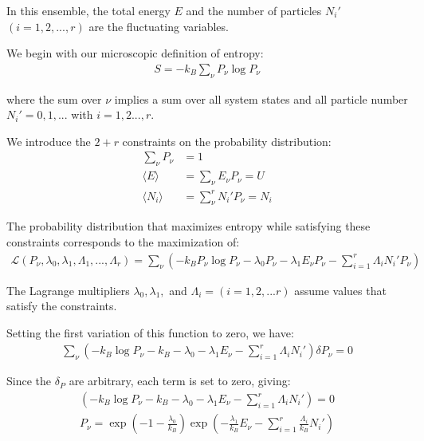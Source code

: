 \documentclass[book.tex]{subfiles}
\begin{document}

In this ensemble, the total energy $E$ and the number of particles $N_i'$ $(i=1,2,...,r)$ are the fluctuating variables.

We begin with our microscopic definition of entropy:
\begin{align}
S = -k_B \sum_\nu P_\nu \log P_\nu 
\end{align}

\noindent where the sum over $\nu$ implies a sum over all system states and
all particle number $N_i' = 0,1,...$ with $i = 1,2...,r$.

We introduce the $2+r$ constraints on the probability distribution:
\begin{align}
\sum_\nu P_\nu &= 1\\
\langle E\rangle &= \sum_\nu E_\nu P_\nu = U \\
\langle N_i \rangle &= \sum_\nu^r N_i' P_\nu = N_i 
\end{align}

The probability distribution that maximizes entropy while satisfying these constraints corresponds to the maximization of:
\begin{align}
\mathcal{L} (P_\nu,\lambda_0,\lambda_1,\Lambda_1,...,\Lambda_r)= \sum_\nu \left( -k_B P_\nu \log P_\nu - \lambda_0 P_\nu - \lambda_1 E_\nu P_\nu - \sum_{i=1} ^r\Lambda_iN_i'P_\nu \right) 
\end{align}

The Lagrange multipliers $\lambda_0, \lambda_1,$ and $\Lambda_i = (i =1,2,...r)$ assume values that satisfy the constraints.

Setting the first variation of this function to zero, we have:
\begin{align}
\sum_\nu\left(-k_B \log P_\nu - k_B - \lambda_0 - \lambda_1 E_\nu - \sum_{i=1} ^r\Lambda_iN_i'\right)\delta P_\nu = 0 
\end{align}

Since the $\delta_P$ are arbitrary, each term is set to zero, giving:
\begin{align}
\left(-k_B  \log P_\nu - k_B - \lambda_0 - \lambda_1 E_\nu - \sum_{i=1} ^r\Lambda_i N_i'\right) =0 \\
P_\nu = \exp \left(-1-\frac{\lambda_0}{k_B}\right) \exp\left(-\frac{\lambda_1}{k_B}E_\nu - \sum_{i=1}^r \frac{\Lambda_i}{k_B} N_i'\right) 
\end{align}
\end{document}
